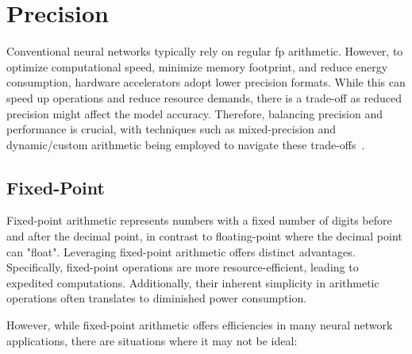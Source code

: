 \section{Precision}

Conventional neural networks typically rely on regular \gls{fp} arithmetic. However, to optimize computational speed, minimize memory footprint, and reduce energy consumption, hardware accelerators adopt lower precision formats. While this can speed up operations and reduce resource demands, there is a trade-off as reduced precision might affect the model accuracy. Therefore, balancing precision and performance is crucial, with techniques such as mixed-precision and dynamic/custom arithmetic being employed to navigate these trade-offs~\cite{micikevicius2017mixed}.
\subsection{Fixed-Point}

Fixed-point arithmetic represents numbers with a fixed number of digits before and after the decimal point, in contrast to floating-point where the decimal point can "float". Leveraging fixed-point arithmetic offers distinct advantages. Specifically, fixed-point operations are more resource-efficient, leading to expedited computations. Additionally, their inherent simplicity in arithmetic operations often translates to diminished power consumption. 


However, while fixed-point arithmetic offers efficiencies in many neural network applications, there are situations where it may not be ideal:

